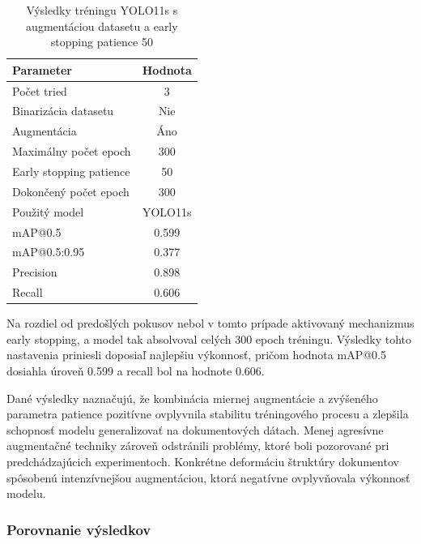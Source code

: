                 \begin{table}[H]
                    \centering
                    \begin{tabular}{|l|c|}
                    \hline
                    \textbf{Parameter} & \textbf{Hodnota} \\ \hline
                    Počet tried & 3 \\ \hline
                    Binarizácia datasetu & Nie \\ \hline
                    Augmentácia & Áno \\ \hline
                    Maximálny počet epoch & 300 \\ \hline
                    Early stopping patience & 50 \\ \hline
                    Dokončený počet epoch & 300 \\ \hline
                    Použitý model & YOLO11s \\ \hline
                    mAP@0.5 & 0.599 \\ \hline
                    mAP@0.5:0.95 & 0.377 \\ \hline
                    Precision & 0.898 \\ \hline
                    Recall & 0.606 \\ \hline
                    \end{tabular}
                    \caption{Výsledky tréningu YOLO11s s augmentáciou datasetu a early stopping patience 50}
                    \label{tab:yolo11s_augmented_lightaug_p50}
                \end{table}

                Na rozdiel od predošlých pokusov nebol v tomto prípade aktivovaný mechanizmus early stopping, a model tak absolvoval celých 300 epoch tréningu. Výsledky tohto nastavenia priniesli doposiaľ najlepšiu výkonnosť, pričom hodnota mAP@0.5 dosiahla úroveň 0.599 a recall bol na hodnote 0.606.

                Dané výsledky naznačujú, že kombinácia miernej augmentácie a zvýšeného parametra patience pozitívne ovplyvnila stabilitu tréningového procesu a zlepšila schopnosť modelu generalizovať na dokumentových dátach. Menej agresívne augmentačné techniky zároveň odstránili problémy, ktoré boli pozorované pri predchádzajúcich experimentoch. Konkrétne deformáciu štruktúry dokumentov spôsobenú intenzívnejšou augmentáciou, ktorá negatívne ovplyvňovala výkonnosť modelu.

                \subsubsection{Porovnanie výsledkov}

